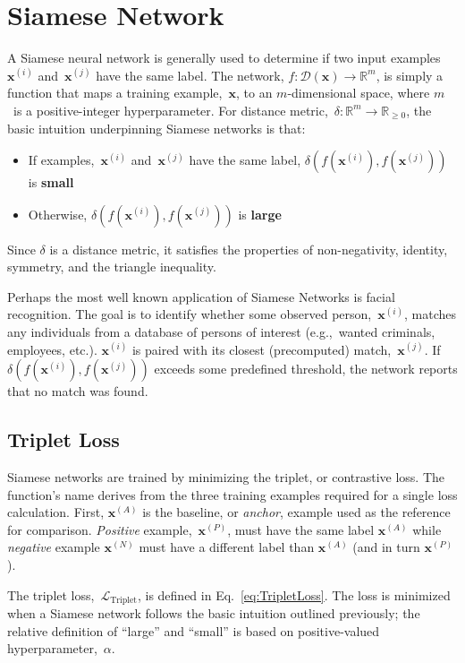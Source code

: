 \documentclass[10pt]{article}
\newcommand{\xI}[1]{\mathbf{x}^{(#1)}}
\newcommand{\xA}{\xI{i}}
\newcommand{\xB}{\xI{j}}
\newcommand{\puDist}[2]{\delta\left(#1, #2\right)}
\newcommand{\nnDist}[3]{\puDist{#1\left(#2\right)}{#1\left(#3\right)}}
\newcommand{\lTrip}{\mathcal{L}_{\text{Triplet}}}
\newcommand{\exA}{\xI{{A}}}
\newcommand{\exP}{\xI{{P}}}
\newcommand{\exN}{\xI{{N}}}
\begin{document}
\section{Siamese Network}\label{sec:Siamese}

  A Siamese neural network is generally used to determine if two input examples $\xA$ and~$\xB$ have the same label.  The network, $f: \mathcal{D}(\mathbf{x}) \rightarrow \mathbb{R}^{m}$, is simply a function that maps a training example,~$\mathbf{x}$, to an $m$-dimensional space, where $m$~is a positive-integer hyperparameter. For distance metric,~$\delta:\mathbb{R}^{m} \rightarrow \mathbb{R}_{{\geq}0}$, the basic intuition underpinning Siamese networks is that:

  \begin{itemize}
    \item If examples,~$\xA$ and~$\xB$ have the same label, $\nnDist{f}{\xA}{\xB}$ is \textbf{small}
    \item Otherwise, $\nnDist{f}{\xA}{\xB}$ is \textbf{large}
  \end{itemize}

  \noindent
  Since $\delta$ is a distance metric, it satisfies the properties of non-negativity, identity, symmetry, and the triangle inequality.

  Perhaps the most well known application of Siamese Networks is facial recognition.  The goal is to identify whether some observed person,~$\xI{i}$, matches any individuals from a database of persons of interest (e.g.,~wanted criminals, employees, etc.).  $\xI{i}$ is paired with its closest (precomputed) match,~$\xI{j}$.  If $\nnDist{f}{\xI{i}}{\xI{j}}$ exceeds some predefined threshold, the network reports that no match was found.

\subsection{Triplet Loss}\label{sec:TripletLoss}

  Siamese networks are trained by minimizing the triplet, or contrastive loss.  The function's name derives from the three training examples required for a single loss calculation. First, $\exA$ is the baseline, or \textit{anchor}, example used as the reference for comparison.  \textit{Positive} example,~$\exP$, must have the same label $\exA$ while \textit{negative} example $\exN$ must have a different label than $\exA$ (and in turn $\exP$).

  The triplet loss,~$\lTrip$, is defined in Eq.~\eqref{eq:TripletLoss}. The loss is minimized when a Siamese network follows the basic intuition outlined previously; the relative definition of ``large'' and ``small'' is based on positive-valued hyperparameter,~$\alpha$.
\end{document}
